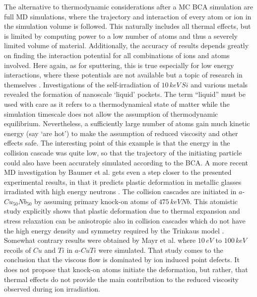 The alternative to thermodynamic considerations after a MC BCA simulation are full MD simulations, where the trajectory and interaction of every atom or ion in the simulation volume is followed. This naturally includes all thermal effects, but is limited by computing power to a low number of atoms and thus a severely limited volume of material. Additionally, the accuracy of results depends greatly on finding the interaction potential for all combinations of ions and atoms involved. Here again, as for sputtering, this is true especially for low energy interactions, where these potentials are not available but a topic of research in themselves \cite{primetzhofer_inelastic_2012,primetzhofer_local_2013}. Investigations of the self-irradiation of $10\,keV\,Si$ and various metals \cite{nordlund_defect_1998} revealed the formation of nanoscale `liquid' pockets. The term ``liquid'' must be used with care as it refers to a thermodynamical state of matter while the simulation timescale does not allow the assumption of thermodynamic equilibrium. Nevertheless, a sufficiently large number of atoms gain much kinetic energy (say `are hot') to make the assumption of reduced viscosity and other effects safe. The interesting point of this example is that the energy in the collision cascade was quite low, so that the trajectory of the initiating particle could also have been accurately simulated according to the BCA. A more recent MD investigation by Baumer et al. gets even a step closer to the presented experimental results, in that it predicts plastic deformation in metallic glasses irradiated with high energy neutrons \cite{baumer_prediction_2014}. The collision cascades are initiated in $a$-$Cu_{50}Nb_{50}$ by assuming primary knock-on atoms of $475\,keV Nb$. This atomistic study explicitly shows that plastic deformation due to thermal expansion and stress relaxation can be anisotropic also in collision cascades which do not have the high energy density and symmetry required by the Trinkaus model \cite{trinkaus_viscoelastic_1995}. Somewhat contrary results were obtained by Mayr et al. \cite{mayr_mechanisms_2003} where $10\,eV$ to $100\,keV$ recoils of $Cu$ and $Ti$ in $a$-$CuTi$ were simulated. That study comes to the conclusion that the viscous flow is dominated by ion induced point defects. It does not propose that knock-on atoms initiate the deformation, but rather, that thermal effects do not provide the main contribution to the reduced viscosity observed during ion irradiation.


